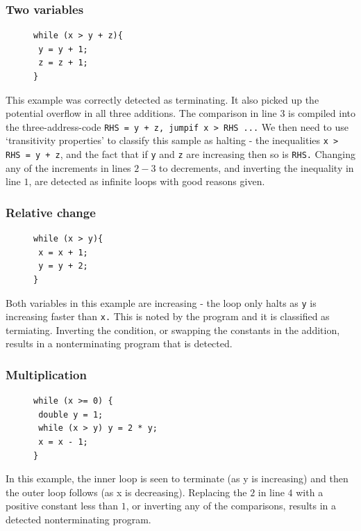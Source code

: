 \documentclass[12pt,a4paper]{article}
\begin{document}
\subsubsection{Two variables \cite[A.6]{tra}}

\begin{figure}
\centering
\begin{lstlisting}[frame=tlrb,language=myLang]
while (x > y + z){
 y = y + 1;
 z = z + 1;
}
\end{lstlisting}
\end{figure}
This example was correctly detected as terminating. It also picked up the potential overflow in all three additions.
The comparison in line $3$ is compiled into the three-address-code \texttt{RHS = y + z, jumpif x > RHS ...}
We then need to use `transitivity properties' to classify this sample as halting - the inequalities \texttt{x > RHS = y + z},
and the fact that if \texttt{y} and \texttt{z} are increasing then so is \texttt{RHS.}
Changing any of the increments in lines $2-3$ to decrements, and inverting the inequality in line $1$, are detected as infinite loops with good reasons given.

\subsubsection{Relative change \cite[A.8]{tra}}

\begin{figure}
\centering
\begin{lstlisting}[frame=tlrb,language=myLang]
while (x > y){
 x = x + 1;
 y = y + 2;
}
\end{lstlisting}
\end{figure}
Both variables in this example are increasing - the loop only halts as \texttt{y} is increasing faster than \texttt{x.}
This is noted by the program and it is classified as termiating. Inverting the condition, or swapping the constants in the addition,
results in a nonterminating program that is detected.

\pagebreak
\subsubsection{Multiplication \cite[C.1]{tra}} \label{mult}

\begin{figure}
\centering
\begin{lstlisting}[frame=tlrb,language=myLang]
while (x >= 0) {
 double y = 1;
 while (x > y) y = 2 * y;
 x = x - 1;
}
\end{lstlisting}
\end{figure}
In this example, the inner loop is seen to terminate (as y is increasing) and then the outer loop follows (as x is decreasing).
Replacing the $2$ in line $4$ with a positive constant less than $1$, or inverting any of the comparisons, results in a detected nonterminating program.
\end{document}

